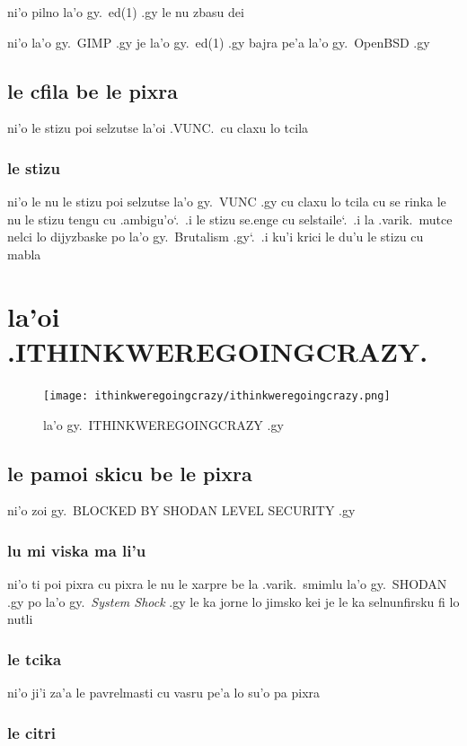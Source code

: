 \documentclass{report}
\newcommand\sds{\spacefactor\sfcode`.\ \space}
\begin{document}
ni'o pilno la'o gy.\ ed(1) .gy le nu zbasu dei

ni'o la'o gy.\ GIMP .gy je la'o gy.\ ed(1) .gy bajra pe'a la'o gy.\ OpenBSD .gy

\section{le cfila be le pixra}
ni'o le stizu poi selzutse la'oi .VUNC.\ cu claxu lo tcila

\subsection{le stizu}
ni'o le nu le stizu poi selzutse la'o gy.\ VUNC .gy cu claxu lo tcila cu se rinka le nu le stizu tengu cu .ambigu'o\sds  .i le stizu se.enge cu selstaile\sds  .i la .varik.\ mutce nelci lo dijyzbaske po la'o gy.\ Brutalism .gy\sds  .i ku'i krici le du'u le stizu cu mabla

\chapter{la'oi .ITHINKWEREGOINGCRAZY.}
\begin{figure}[ht]
	\centering
	\texttt{[image: ithinkweregoingcrazy/ithinkweregoingcrazy.png]}
	\caption[center]{la'o gy.\ ITHINKWEREGOINGCRAZY .gy}
\end{figure}
\section{le pamoi skicu be le pixra}
ni'o zoi gy.\ BLOCKED BY SHODAN LEVEL SECURITY .gy

\subsection{lu mi viska ma li'u}
ni'o ti poi pixra cu pixra le nu le xarpre be la .varik.\ smimlu la'o gy.\ SHODAN .gy po la'o gy.\ \textit{System Shock} .gy le ka jorne lo jimsko kei je le ka selnunfirsku fi lo nutli

\subsection{le tcika}
ni'o ji'i za'a le pavrelmasti cu vasru pe'a lo su'o pa pixra

\subsection{le citri}
\end{document}
